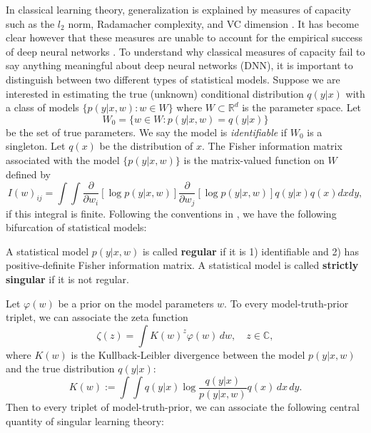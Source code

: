 \documentclass{article} %
\begin{document}
In classical learning theory, generalization is explained by measures of capacity such as the $l_2$ norm, Radamacher complexity, and VC dimension \citep{bousquet2003introduction}. It has become clear however that these measures are unable to account for the empirical success of deep neural networks \citep{zhang_understanding_2017}. 
To understand why classical measures of capacity fail to say anything meaningful about deep neural networks (DNN), it is important to distinguish between two different types of statistical models. Suppose we are interested in estimating the true (unknown) conditional distribution $q(y|x)$ with a class of models $\{p(y|x,w): w \in W\}$ where $W \subset \mathbb R^d$ is the parameter space. Let 
$$
W_0 = \{w \in W: p(y|x,w)=q(y|x)\}
$$
 be the set of true parameters. We say the model is \textit{identifiable} if $W_0$ is a singleton. Let $q(x)$ be the distribution of $x$. The Fisher information matrix associated with the model $\{p(y|x,w)\}$ is the matrix-valued function on $W$ defined by
 \begin{equation*}
 I(w)_{ij} = \int\!\int \frac{\partial}{\partial w_i}[ \log p(y|x,w) ] \frac{\partial}{\partial w_j}[ \log p(y|x,w) ] q(y|x) q(x) dx dy,
 \label{eq:FIM}
 \end{equation*}
if this integral is finite. 
Following the conventions in \cite{watanabe_algebraic_2009}, we have the following bifurcation of statistical models:
\begin{definition}
A statistical model $p(y|x,w)$ is called \textbf{regular} if it is 1) identifiable and 2) has positive-definite Fisher information matrix. A statistical model is called \textbf{strictly singular} if it is not regular. 
\end{definition}


Let  $\varphi(w)$ be a prior on the model parameters $w$.
To every model-truth-prior triplet, we can associate the zeta function
\begin{equation}
\zeta(z) = \int K(w)^z \varphi(w) \,dw, \quad z \in \mathbb C,
\end{equation} 
where $K(w)$ is the Kullback-Leibler divergence between the model $p(y|x,w)$ and the true distribution $q(y|x)$:
\begin{equation}
    K(w) := \int \!\int q(y|x) \log \frac{ q(y|x) }{ p(y|x,w) } q(x) \,dx \,dy.
\end{equation}
Then to every triplet of model-truth-prior, we can associate the following central quantity of singular learning theory:
\end{document}
